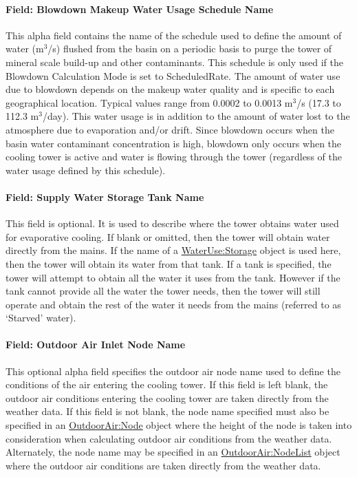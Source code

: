 \paragraph{Field: Blowdown Makeup Water Usage Schedule Name}\label{field-blowdown-makeup-water-usage-schedule-name-2}

This alpha field contains the name of the schedule used to define the amount of water (m\(^{3}\)/s) flushed from the basin on a periodic basis to purge the tower of mineral scale build-up and other contaminants. This schedule is only used if the Blowdown Calculation Mode is set to ScheduledRate. The amount of water use due to blowdown depends on the makeup water quality and is specific to each geographical location. Typical values range from 0.0002 to 0.0013 m\(^{3}\)/s (17.3 to 112.3 m\(^{3}\)/day). This water usage is in addition to the amount of water lost to the atmosphere due to evaporation and/or drift. Since blowdown occurs when the basin water contaminant concentration is high, blowdown only occurs when the cooling tower is active and water is flowing through the tower (regardless of the water usage defined by this schedule).

\paragraph{Field: Supply Water Storage Tank Name}\label{field-supply-water-storage-tank-name-2}

This field is optional. It is used to describe where the tower obtains water used for evaporative cooling. If blank or omitted, then the tower will obtain water directly from the mains. If the name of a \hyperref[waterusestorage]{WaterUse:Storage} object is used here, then the tower will obtain its water from that tank. If a tank is specified, the tower will attempt to obtain all the water it uses from the tank. However if the tank cannot provide all the water the tower needs, then the tower will still operate and obtain the rest of the water it needs from the mains (referred to as `Starved' water).

\paragraph{Field: Outdoor Air Inlet Node Name}\label{field-outdoor-air-inlet-node-name-2}

This optional alpha field specifies the outdoor air node name used to define the conditions of the air entering the cooling tower. If this field is left blank, the outdoor air conditions entering the cooling tower are taken directly from the weather data. If this field is not blank, the node name specified must also be specified in an \hyperref[outdoorairnode]{OutdoorAir:Node} object where the height of the node is taken into consideration when calculating outdoor air conditions from the weather data. Alternately, the node name may be specified in an \hyperref[outdoorairnodelist]{\hyperref[outdoorairnode]{OutdoorAir:Node}List} object where the outdoor air conditions are taken directly from the weather data.


